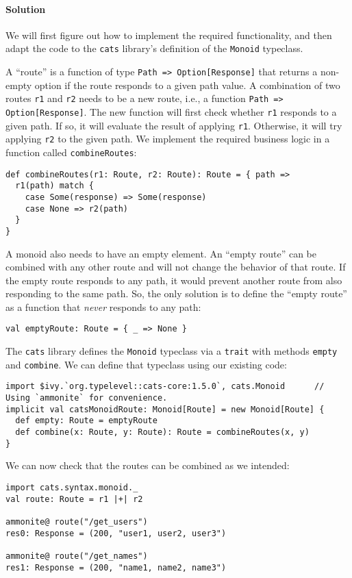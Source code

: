 \paragraph{Solution}

We will first figure out how to implement the required functionality,
and then adapt the code to the \texttt{cats} library\textsf{'}s definition
of the \lstinline!Monoid! typeclass.

A \textsf{``}route\textsf{''} is a function of type \lstinline!Path => Option[Response]!
that returns a non-empty option if the route responds to a given path
value. A combination of two routes \lstinline!r1! and \lstinline!r2!
needs to be a new route, i.e., a function \lstinline!Path => Option[Response]!.
The new function will first check whether \lstinline!r1! responds
to a given path. If so, it will evaluate the result of applying \lstinline!r1!.
Otherwise, it will try applying \lstinline!r2! to the given path.
We implement the required business logic in a function called \lstinline!combineRoutes!:
\begin{lstlisting}
def combineRoutes(r1: Route, r2: Route): Route = { path =>
  r1(path) match {
    case Some(response) => Some(response)
    case None => r2(path)
  }
}
\end{lstlisting}

A monoid also needs to have an empty element. An \textsf{``}empty route\textsf{''}
can be combined with any other route and will not change the behavior
of that route. If the empty route responds to any path, it would prevent
another route from also responding to the same path. So, the only
solution is to define the \textsf{``}empty route\textsf{''} as a function that \emph{never}
responds to any path:
\begin{lstlisting}
val emptyRoute: Route = { _ => None }
\end{lstlisting}

The \texttt{cats} library defines the \lstinline!Monoid! typeclass
via a \lstinline!trait! with methods \lstinline!empty! and \lstinline!combine!.
We can define that typeclass using our existing code:
\begin{lstlisting}
import $ivy.`org.typelevel::cats-core:1.5.0`, cats.Monoid      // Using `ammonite` for convenience.
implicit val catsMonoidRoute: Monoid[Route] = new Monoid[Route] {
  def empty: Route = emptyRoute
  def combine(x: Route, y: Route): Route = combineRoutes(x, y)
}
\end{lstlisting}
We can now check that the routes can be combined as we intended:
\begin{lstlisting}
import cats.syntax.monoid._
val route: Route = r1 |+| r2

ammonite@ route("/get_users")
res0: Response = (200, "user1, user2, user3")

ammonite@ route("/get_names")
res1: Response = (200, "name1, name2, name3")
\end{lstlisting}

